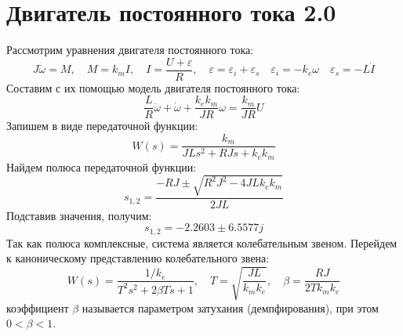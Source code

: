 \section{Двигатель постоянного тока 2.0}
Рассмотрим уравнения двигателя постоянного тока:
\begin{equation}
    J\dot{\omega} = M,\quad M = k_mI,\quad I=\frac{U + \varepsilon}{R},\quad\varepsilon = \varepsilon_i + \varepsilon_s\quad\varepsilon_i = -k_e\omega\quad\varepsilon_s = -L\dot{I}
\end{equation}
Составим с их помощью модель двигателя постоянного тока:
\begin{equation}
    \frac{L}{R} \ddot{\omega} + \dot{\omega} + \frac{k_ek_m}{JR}\omega = \frac{k_m}{JR} U
    \label{eq:dc_motor2_deq}
\end{equation}
Запишем в виде передаточной функции:
\begin{equation}
    W(s) = \frac{k_m}{JLs^2 + RJs + k_ek_m} 
\end{equation}
Найдем полюса передаточной функции:
\begin{equation}
    s_{1,2} = \frac{-RJ \pm \sqrt{R^2J^2 - 4JLk_ek_m}}{2JL}
\end{equation}
Подставив значения, получим: 
\begin{equation}
    s_{1,2} = -2.2603 \pm 6.5577j
\end{equation}
Так как полюса комплексные, система является колебательным звеном.
Перейдем к каноническому представлению колебательного звена:
\begin{equation}
    W(s) = \frac{1/k_e}{T^2s^2 + 2\beta Ts + 1}, \quad T = \sqrt{\frac{JL}{k_mk_e}}, \quad \beta = \frac{RJ}{2Tk_mk_e}
\end{equation}
коэффициент $\beta$ называется параметром затухания (демпфирования), при этом $0 < \beta < 1$. 

